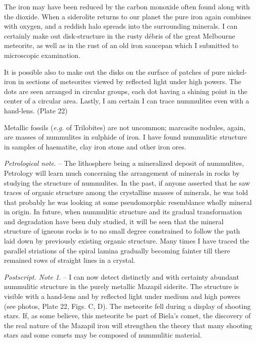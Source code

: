 \documentclass[a4paper, 12pt, oneside]{article}
\begin{document}
The iron may have been reduced by the carbon monoxide often found along with the dioxide. When a siderolite returns to our planet the pure iron again combines with oxygen, and a reddish halo spreads into the surrounding minerals. I can certainly make out disk-structure in the rusty débris of the great Melbourne meteorite, as well as in the rust of an old iron saucepan which I submitted to microscopic examination.

It is possible also to make out the disks on the surface of patches of pure nickel-iron in sections of meteorites viewed by reflected light under high powers. The dots are seen arranged in circular groups, each dot having a shining point in the center of a circular area. Lastly, I am certain I can trace nummulites even with a hand-lens. (Plate 22)

Metallic fossils (\emph{e.g.} of Trilobites) are not uncommon; marcasite nodules, again, are masses of nummulites in sulphide of iron. I have found nummulitic structure in samples of haematite, clay iron stone and other iron ores.

\emph{Petrological note}. -- The lithosphere being a mineralized deposit of nummulites, Petrology will learn much concerning the arrangement of minerals in rocks by studying the structure of nummulites. In the past, if anyone asserted that he saw traces of organic structure among the crystalline masses of minerals, he was told that probably he was looking at some pseudomorphic resemblance wholly mineral in origin. In future, when nummulitic structure and its gradual transformation and degradation have been duly studied, it will be seen that the mineral structure of igneous rocks is to no small degree constrained to follow the path laid down by previously existing organic structure. Many times I have traced the parallel striations of the spiral lamina gradually becoming fainter till there remained rows of straight lines in a crystal.

\emph{Postscript. Note 1}. -- I can now detect distinctly and with certainty abundant nummulitic structure in the purely metallic Mazapil siderite. The structure is visible with a hand-lens and by reflected light under medium and high powers (see photos, Plate 22, Figs. C, D). The meteorite fell during a display of shooting stars. If, as some believe, this meteorite be part of Biela's comet, the discovery of the real nature of the Mazapil iron will strengthen the theory that many shooting stars and some comets may be composed of nummulitic material.
\end{document}
